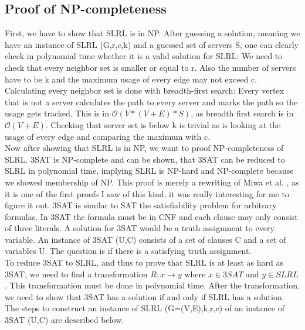 \documentclass [12pt]{article}
\begin{document}
\subsection{Proof of NP-completeness}
First, we have to show that SLRL is in NP. After guessing a solution, meaning we 
have an instance of SLRL (G,r,c,k) and a guessed set of servers S, one can clearly check 
in polynomial time whether it is a valid solution for SLRL: We need to check that every neighbor set is smaller
or equal to r. Also the number of servers have to be k and the maximum usage of every edge may not exceed c.
Calculating every neighbor set is done with breadth-first search: Every vertex that is not a server calculates
the path to every server and marks the path so the usage gets tracked. This is in $\mathcal{O}(V*(V+E)*S)$, as breadth first
search is in $\mathcal{O}(V+E)$. Checking that server set is below k is trivial as is looking at the usage of
every edge and comparing the maximum with c.\\
Now after showing that SLRL is in NP, we want to proof NP-completeness of SLRL.
3SAT is NP-complete \cite{Garey:1979:CIG:578533} and can be shown, that 3SAT can be reduced to SLRL in polynomial time,
implying SLRL is NP-hard and NP-complete because we showed membership of NP. 
This proof is merely a rewriting of Miwa et al. \cite{mirrorserver}, as it is one of the first proofs I saw of 
this kind, it was really interesting for me to figure it out.
3SAT is similar to SAT the satisfiability problem for arbitrary formulas. In 3SAT the formula must be in CNF and 
each clause may only consist of three literals. A solution for 3SAT would be a truth assignment to every
variable. An instance of 3SAT (U,C) consists of a set of clauses C and a set of variables U. The question is if there is a satisfying
truth assignment.\\
To reduce 3SAT to SLRL, and thus to prove that SLRL is at least as hard as 3SAT, we need to find a 
transformation $R: x \rightarrow y$ where $x \in 3SAT$ and $y \in SLRL$. This transformation must be 
done in polynomial time. After the transformation, we need to show that 3SAT has a solution if and only if 
SLRL has a solution.\\
The steps to construct an instance of SLRL (G=(V,E),k,r,c) of an instance of 3SAT (U,C) are described below.
\end{document}

